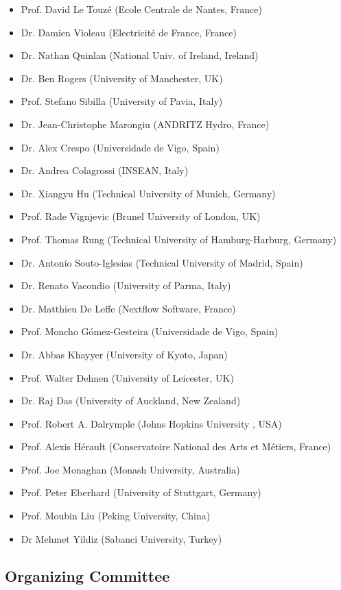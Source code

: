 \begin{itemize}
\item Prof. David Le Touz\'e (Ecole Centrale de Nantes, France)
\item Dr. Damien Violeau (Electricit\'e de France, France)
\item Dr. Nathan Quinlan (National Univ. of Ireland, Ireland)
\item Dr. Ben Rogers (University of Manchester, UK)
\item Prof. Stefano Sibilla (University of Pavia, Italy)
\item Dr. Jean-Christophe Marongiu (ANDRITZ Hydro, France)
\item Dr. Alex Crespo (Universidade de Vigo, Spain)
\item Dr. Andrea Colagrossi (INSEAN, Italy)
\item Dr. Xiangyu Hu (Technical University of Munich, Germany)
\item Prof. Rade Vignjevic (Brunel University of London, UK)
\item Prof. Thomas Rung (Technical University of Hamburg-Harburg, Germany)
\item Dr. Antonio Souto-Iglesias (Technical University of Madrid, Spain)
\item Dr. Renato Vacondio (University of Parma, Italy)
\item Dr. Matthieu De Leffe (Nextflow Software, France)
\item Prof. Moncho G\'omez-Gesteira (Universidade de Vigo, Spain)
\item Dr. Abbas Khayyer (University of Kyoto, Japan)
\item Prof. Walter Dehnen (University of Leicester, UK)
\item Dr. Raj Das (University of Auckland, New Zealand)
\item Prof. Robert A. Dalrymple (Johns Hopkins University , USA)
\item Prof. Alexis H\'erault (Conservatoire National des Arts et M\'etiers, France)
\item Prof. Joe Monaghan (Monash University, Australia)
\item Prof. Peter Eberhard (University of Stuttgart, Germany)
\item Prof. Moubin Liu (Peking University, China)
\item Dr Mehmet Yildiz (Sabanci University, Turkey)
\end{itemize}



\subsection*{Organizing Committee}
